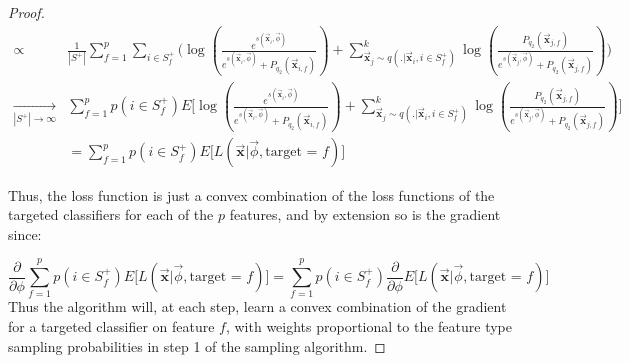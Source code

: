 \documentclass{article} %
\begin{document}
\begin{proof}
\begin{align*}
    \propto & \frac{1}{|S^+|} \sum_{f=1}^p \sum_{i \in S^+_f} \Big( \log(\frac{e^{s(\vec{\mathbf{x}}_i,\vec{\phi}) }}{e^{s(\vec{\mathbf{x}}_i,\vec{\phi}) } + P_{q_2}(\vec{\mathbf{x}}_{i,f}) }) + \sum_{\vec{\mathbf{x}}_{j} \sim q(.|\vec{\mathbf{x}}_i,i\in S^+_f)}^k \log(\frac{ P_{q_2}(\vec{\mathbf{x}}_{j,f})}{e^{s(\vec{\mathbf{x}}_{j},\vec{\phi}) } + P_{q_2}(\vec{\mathbf{x}}_{j,f})}) \Big) \\
    \xrightarrow[|S^+|\rightarrow \infty]{ }  & \sum_{f=1}^p p(i \in S^+_f) E\Big[ \log(\frac{e^{s(\vec{\mathbf{x}}_i,\vec{\phi}) }}{e^{s(\vec{\mathbf{x}}_i,\vec{\phi}) } + P_{q_2}(\vec{\mathbf{x}}_{i,f}) }) + \sum_{\vec{\mathbf{x}}_{j} \sim q(.|\vec{\mathbf{x}}_i,i\in S^+_f)}^k \log(\frac{ P_{q_2}(\vec{\mathbf{x}}_{j,f})}{e^{s(\vec{\mathbf{x}}_{j},\vec{\phi}) } + P_{q_2}(\vec{\mathbf{x}}_{j,f})}) \Big] \\
   & = \sum_{f=1}^p p(i \in S^+_f) E\Big[ L(\vec{\mathbf{x}} |\vec{\phi}, \text{target = $f$}) \Big]
\end{align*}

Thus, the loss function is just a convex combination  of the loss functions of the targeted classifiers for each of the $p$ features, and by extension so is the gradient since:

\[\frac{\partial }{\partial \phi}\sum_{f=1}^p p(i \in S^+_f) E\Big[ L(\vec{\mathbf{x}} |\vec{\phi}, \text{target = $f$}) \Big] =
 \sum_{f=1}^p p(i \in S^+_f) \frac{\partial }{\partial \phi}E\Big[ L(\vec{\mathbf{x}} |\vec{\phi}, \text{target = $f$}) \Big]\]
 Thus the algorithm will, at each step, learn a convex combination of the gradient for a targeted classifier on feature $f$, with weights proportional to the feature type sampling probabilities in step 1 of the sampling algorithm.
\end{proof}
\end{document}
